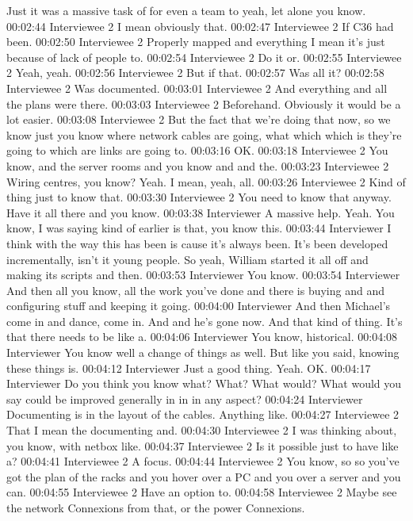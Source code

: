 Just it was a massive task of for even a team to yeah, let alone you know.
00:02:44 Interviewee 2 
I mean obviously that.
00:02:47 Interviewee 2 
If C36 had been.
00:02:50 Interviewee 2 
Properly mapped and everything I mean it's just because of lack of people to.
00:02:54 Interviewee 2 
Do it or.
00:02:55 Interviewee 2 
Yeah, yeah.
00:02:56 Interviewee 2 
But if that.
00:02:57
Was all it?
00:02:58 Interviewee 2 
Was documented.
00:03:01 Interviewee 2 
And everything and all the plans were there.
00:03:03 Interviewee 2 
Beforehand. Obviously it would be a lot easier.
00:03:08 Interviewee 2 
But the fact that we're doing that now, so we know just you know where network cables are going, what which which is they're going to which are links are going to.
00:03:16
OK.
00:03:18 Interviewee 2 
You know, and the server rooms and you know and and the.
00:03:23 Interviewee 2 
Wiring centres, you know? Yeah. I mean, yeah, all.
00:03:26 Interviewee 2 
Kind of thing just to know that.
00:03:30 Interviewee 2 
You need to know that anyway. Have it all there and you know.
00:03:38 Interviewer
A massive help. Yeah. You know, I was saying kind of earlier is that, you know this.
00:03:44 Interviewer
I think with the way this has been is cause it's always been. It's been developed incrementally, isn't it young people. So yeah, William started it all off and making its scripts and then.
00:03:53 Interviewer
You know.
00:03:54 Interviewer
And then all you know, all the work you've done and there is buying and and configuring stuff and keeping it going.
00:04:00 Interviewer
And then Michael's come in and dance, come in. And and he's gone now. And that kind of thing. It's that there needs to be like a.
00:04:06 Interviewer
You know, historical.
00:04:08 Interviewer
You know well a change of things as well. But like you said, knowing these things is.
00:04:12 Interviewer
Just a good thing. Yeah. OK.
00:04:17 Interviewer
Do you think you know what? What? What would? What would you say could be improved generally in in in any aspect?
00:04:24 Interviewer
Documenting is in the layout of the cables. Anything like.
00:04:27 Interviewee 2 
That I mean the documenting and.
00:04:30 Interviewee 2 
I was thinking about, you know, with netbox like.
00:04:37 Interviewee 2 
Is it possible just to have like a?
00:04:41 Interviewee 2 
A focus.
00:04:44 Interviewee 2 
You know, so so you've got the plan of the racks and you hover over a PC and you over a server and you can.
00:04:55 Interviewee 2 
Have an option to.
00:04:58 Interviewee 2 
Maybe see the network Connexions from that, or the power Connexions.
